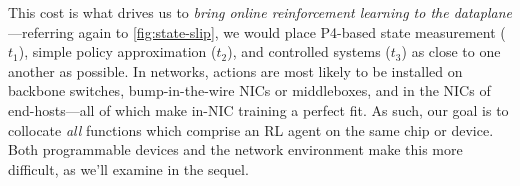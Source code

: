 \documentclass[
sigconf,natbib=false
]{acmart}
\newcounter{insightc}
\newenvironment{insight}
	{
		\begin{tipblock}\refstepcounter{insightc}\textbf{Insight \theinsightc:}\em
	}
	{
		\end{tipblock}
	}
\begin{document}

This cost is what drives us to \emph{bring online reinforcement learning to the dataplane}---referring again to \cref{fig:state-slip}, we would place P4-based state measurement ($t_1$), simple policy approximation ($t_2$), and controlled systems ($t_3$) as close to one another as possible.
In networks, actions are most likely to be installed on backbone switches, bump-in-the-wire NICs or middleboxes, and in the NICs of end-hosts---all of which make in-NIC training a perfect fit.
As such, our goal is to collocate \emph{all} functions which comprise an RL agent on the same chip or device.
Both programmable devices and the network environment make this more difficult, as we'll examine in the sequel.


\end{document}
